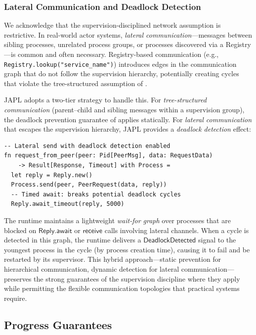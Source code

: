 \documentclass[11pt,a4paper]{article}
\begin{document}
\subsubsection{Lateral Communication and Deadlock Detection}

We acknowledge that the supervision-disciplined network assumption is restrictive. In real-world actor systems, \emph{lateral communication}---messages between sibling processes, unrelated process groups, or processes discovered via a Registry---is common and often necessary. Registry-based communication (e.g., \texttt{Registry.lookup("service\_name")}) introduces edges in the communication graph that do not follow the supervision hierarchy, potentially creating cycles that violate the tree-structured assumption of .

JAPL adopts a two-tier strategy to handle this. For \emph{tree-structured communication} (parent--child and sibling messages within a supervision group), the deadlock prevention guarantee of  applies statically. For \emph{lateral communication} that escapes the supervision hierarchy, JAPL provides a \emph{deadlock detection} effect:

\begin{lstlisting}[language=japl,caption={Deadlock-aware lateral communication}]
-- Lateral send with deadlock detection enabled
fn request_from_peer(peer: Pid[PeerMsg], data: RequestData)
    -> Result[Response, Timeout] with Process =
  let reply = Reply.new()
  Process.send(peer, PeerRequest(data, reply))
  -- Timed await: breaks potential deadlock cycles
  Reply.await_timeout(reply, 5000)
\end{lstlisting}

The runtime maintains a lightweight \emph{wait-for graph} over processes that are blocked on $\mathsf{Reply.await}$ or $\mathsf{receive}$ calls involving lateral channels. When a cycle is detected in this graph, the runtime delivers a $\mathsf{DeadlockDetected}$ signal to the youngest process in the cycle (by process creation time), causing it to fail and be restarted by its supervisor. This hybrid approach---static prevention for hierarchical communication, dynamic detection for lateral communication---preserves the strong guarantees of the supervision discipline where they apply while permitting the flexible communication topologies that practical systems require.

\subsection{Progress Guarantees}
\end{document}
